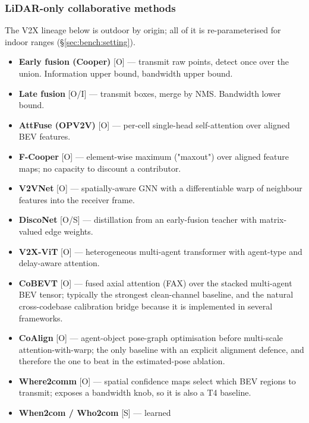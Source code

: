 \subsubsection{LiDAR-only collaborative methods}
\label{sec:bench:lidar}
The V2X lineage below is outdoor by origin; all of it is re-parameterised for
indoor ranges (\S\ref{sec:bench:setting}).
\begin{itemize}
  \item \textbf{Early fusion (Cooper)} \cite{cooper} [O] --- transmit raw
        points, detect once over the union. Information upper bound, bandwidth
        upper bound.
  \item \textbf{Late fusion} [O/I] --- transmit boxes, merge by NMS. Bandwidth
        lower bound.
  \item \textbf{AttFuse (OPV2V)} \cite{opv2v} [O] --- per-cell single-head
        self-attention over aligned BEV features.
  \item \textbf{F-Cooper} \cite{fcooper} [O] --- element-wise maximum
        ("maxout") over aligned feature maps; no capacity to discount a
        contributor.
  \item \textbf{V2VNet} \cite{v2vnet} [O] --- spatially-aware GNN with a
        differentiable warp of neighbour features into the receiver frame.
  \item \textbf{DiscoNet} \cite{disconet} [O/S] --- distillation from an
        early-fusion teacher with matrix-valued edge weights.
  \item \textbf{V2X-ViT} \cite{v2xvit} [O] --- heterogeneous multi-agent
        transformer with agent-type and delay-aware attention.
  \item \textbf{CoBEVT} \cite{cobevt} [O] --- fused axial attention (FAX) over
        the stacked multi-agent BEV tensor; typically the strongest
        clean-channel baseline, and the natural cross-codebase calibration
        bridge because it is implemented in several frameworks.
  \item \textbf{CoAlign} \cite{coalign} [O] --- agent-object pose-graph
        optimisation before multi-scale attention-with-warp; the only baseline
        with an explicit alignment defence, and therefore the one to beat in the
        estimated-pose ablation.
  \item \textbf{Where2comm} \cite{where2comm} [O] --- spatial confidence maps
        select which BEV regions to transmit; exposes a bandwidth knob, so it is
        also a T4 baseline.
  \item \textbf{When2com / Who2com} \cite{when2com,who2com} [S] --- learned

\end{itemize}
